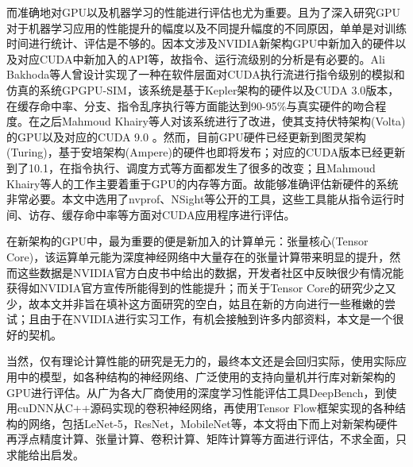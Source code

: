 \par 而准确地对GPU以及机器学习的性能进行评估也尤为重要。且为了深入研究GPU对于机器学习应用的性能提升的幅度以及不同提升幅度的不同原因，单单是对训练时间进行统计、评估是不够的。因本文涉及NVIDIA新架构GPU中新加入的硬件以及对应CUDA中新加入的API等，故指令、运行流级别的分析是有必要的。Ali Bakhoda等人曾设计实现了一种在软件层面对CUDA执行流进行指令级别的模拟和仿真的系统GPGPU-SIM，该系统是基于Kepler架构的硬件以及CUDA 3.0版本，在缓存命中率、分支、指令乱序执行等方面能达到90-95\%与真实硬件的吻合程度\cite{GPGPUSIM}。在之后Mahmoud Khairy等人对该系统进行了改进，使其支持伏特架构(Volta)的GPU以及对应的CUDA 9.0 \cite{GPGPUSIM2}。然而，目前GPU硬件已经更新到图灵架构(Turing)，基于安培架构(Ampere)的硬件也即将发布；对应的CUDA版本已经更新到了10.1，在指令执行、调度方式等方面都发生了很多的改变；且Mahmoud Khairy等人的工作主要着重于GPU的内存等方面。故能够准确评估新硬件的系统非常必要。本文中选用了nvprof、NSight等公开的工具，这些工具能从指令运行时间、访存、缓存命中率等方面对CUDA应用程序进行评估\cite{NSIGHT}。
\par 在新架构的GPU中，最为重要的便是新加入的计算单元：张量核心(Tensor Core)，该运算单元能为深度神经网络中大量存在的张量计算带来明显的提升\cite{VOLTAWHITEPAPER}，然而这些数据是NVIDIA官方白皮书中给出的数据，开发者社区中反映很少有情况能获得如NVIDIA官方宣传所能得到的性能提升；而关于Tensor Core的研究少之又少，故本文并非旨在填补这方面研究的空白，姑且在新的方向进行一些稚嫩的尝试；且由于在NVIDIA进行实习工作，有机会接触到许多内部资料，本文是一个很好的契机。
\par 当然，仅有理论计算性能的研究是无力的，最终本文还是会回归实际，使用实际应用中的模型，如各种结构的神经网络、广泛使用的支持向量机并行库对新架构的GPU进行评估。从广为各大厂商使用的深度学习性能评估工具DeepBench\cite{DEEPBENCH}，到使用cuDNN从C++源码实现的卷积神经网络，再使用Tensor Flow框架实现的各种结构的网络，包括LeNet-5\cite{LENET}，ResNet\cite{RESNET}，MobileNet\cite{MOBILE}等，本文将由下而上对新架构硬件再浮点精度计算、张量计算、卷积计算、矩阵计算等方面进行评估，不求全面，只求能给出启发。

